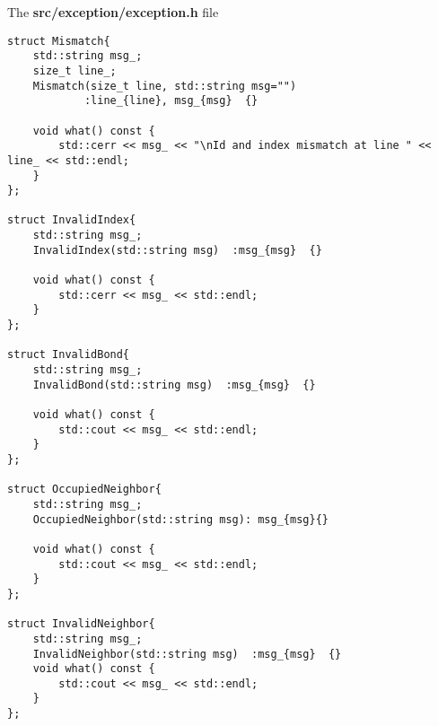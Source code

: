 
The \textbf{src/exception/exception.h} file

\begin{lstlisting}[style=CStyle]
struct Mismatch{
    std::string msg_;
    size_t line_;
    Mismatch(size_t line, std::string msg="")
            :line_{line}, msg_{msg}  {}

    void what() const {
        std::cerr << msg_ << "\nId and index mismatch at line " << line_ << std::endl;
    }
};

struct InvalidIndex{
    std::string msg_;
    InvalidIndex(std::string msg)  :msg_{msg}  {}

    void what() const {
        std::cerr << msg_ << std::endl;
    }
};

struct InvalidBond{
    std::string msg_;
    InvalidBond(std::string msg)  :msg_{msg}  {}

    void what() const {
        std::cout << msg_ << std::endl;
    }
};

struct OccupiedNeighbor{
    std::string msg_;
    OccupiedNeighbor(std::string msg): msg_{msg}{}

    void what() const {
        std::cout << msg_ << std::endl;
    }
};

struct InvalidNeighbor{
    std::string msg_;
    InvalidNeighbor(std::string msg)  :msg_{msg}  {}
    void what() const {
        std::cout << msg_ << std::endl;
    }
};

\end{lstlisting}


